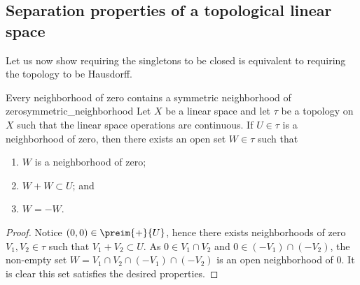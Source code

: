 \subsection{Separation properties of a topological linear space}
Let us now show requiring the singletons to be closed is equivalent to requiring the topology to be Hausdorff.
\begin{lemma}{Every neighborhood of zero contains a symmetric neighborhood of zero}{symmetric_neighborhood}
    Let \(X\) be a linear space and let \(\tau\) be a topology on \(X\) such that the linear space operations are continuous. If \(U \in \tau\) is a neighborhood of zero, then there exists an open set \(W \in \tau\) such that
    \begin{enumerate}[label=(\alph*)]
        \item \(W\) is a neighborhood of zero;
        \item \(W + W \subset U\); and
        \item \(W = -W\).
    \end{enumerate}
\end{lemma}
\begin{proof}
    Notice \((0,0) \in \preim{+}{U}\), hence there exists neighborhoods of zero \(V_1, V_2 \in \tau\) such that \(V_1 + V_2 \subset U.\) As \(0 \in V_1 \cap V_2\) and \(0 \in (-V_1) \cap (-V_2)\), the non-empty set \(W = V_1 \cap V_2 \cap (-V_1) \cap (-V_2)\) is an open neighborhood of \(0\). It is clear this set satisfies the desired properties.
\end{proof}

